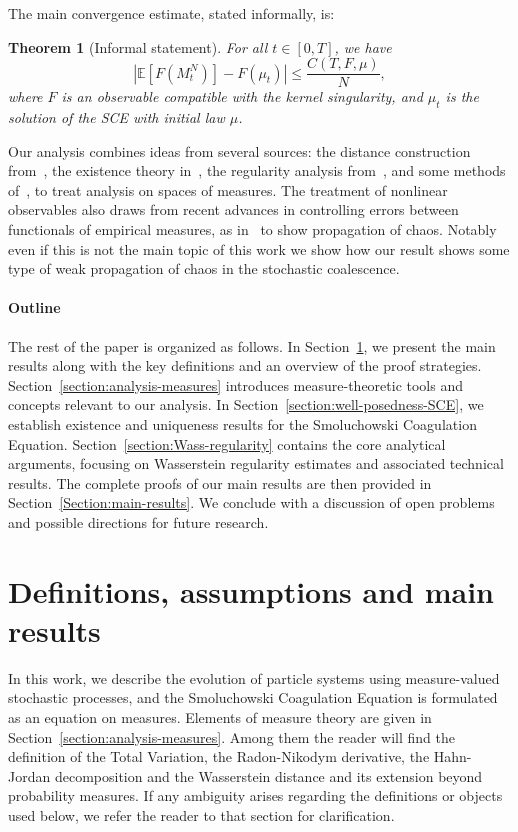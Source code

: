 \documentclass[11pt,a4paper]{article}
\newtheorem{theorem}{Theorem}[section]
\begin{document}
The main convergence estimate, stated informally, is:
\begin{theorem}[Informal statement]
    For all $t \in [0,T]$, we have
    \[
        \left| \mathbb{E}\left[F\left(M^N_t\right)\right] - F(\mu_t) \right| \leq \frac{C(T, F, \mu)}{N},
    \]
    where $F$ is an observable compatible with the kernel singularity, and $\mu_t$ is the solution of the SCE with initial law $\mu$.
\end{theorem}

Our analysis combines ideas from several sources: the distance construction from~\cite{cepedaSmoluchowskisEquationRate2011a}, the existence theory in~\cite{norrisSmoluchowskisCoagulationEquation1999}, the regularity analysis from~\cite{kolokoltsov2010central}, and some methods of~\cite{martiniKolmogorovEquationsSpaces2023}, to treat analysis on spaces of measures. The treatment of nonlinear observables also draws from recent advances in controlling errors between functionals of empirical measures, as in~\cite{delarue2025uniform} to show propagation of chaos. Notably even if this is not the main topic of this work we show how our result shows some type of weak propagation of chaos in the stochastic coalescence.

\paragraph{Outline}

The rest of the paper is organized as follows. In Section~\ref{section-main-results}, we present the main results along with the key definitions and an overview of the proof strategies. Section~\ref{section:analysis-measures} introduces measure-theoretic tools and concepts relevant to our analysis. In Section~\ref{section:well-posedness-SCE}, we establish existence and uniqueness results for the Smoluchowski Coagulation Equation. Section~\ref{section:Wass-regularity} contains the core analytical arguments, focusing on Wasserstein regularity estimates and associated technical results. The complete proofs of our main results are then provided in Section~\ref{Section:main-results}. We conclude with a discussion of open problems and possible directions for future research.



\section{Definitions, assumptions and main results}\label{section-main-results}
In this work, we describe the evolution of particle systems using measure-valued stochastic processes, and the Smoluchowski Coagulation Equation is formulated as an equation on measures. Elements of measure theory are given in Section~\ref{section:analysis-measures}. Among them the reader will find the definition of the Total Variation, the Radon-Nikodym derivative, the Hahn-Jordan decomposition and the Wasserstein distance and its extension beyond probability measures. If any ambiguity arises regarding the definitions or objects used below, we refer the reader to that section for clarification.
\end{document}
